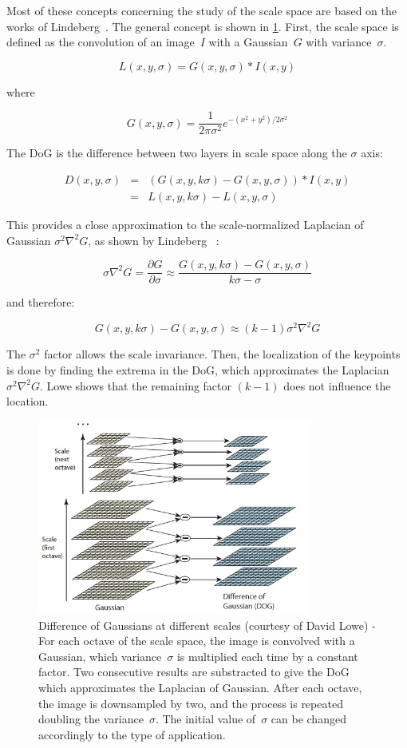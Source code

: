 Most of these concepts concerning the study of the scale space are based on the works of Lindeberg~\cite{Lindeberg_1994}. The general concept is shown in \ref{fig:sift_dog}. First, the scale space is defined as the convolution of an image~$I$ with a Gaussian~$G$ with variance~$\sigma$.

\[ L(x,y,\sigma) = G(x,y,\sigma) * I(x,y) \]

where

\[ G(x,y,\sigma) = \frac{1}{2\pi\sigma^2}e^{-{(x^2+y^2)/2\sigma^2}} \]


The \gls{DoG} is the difference between two layers in scale space along the $\sigma$ axis:

\[
\begin{array}{rcl}
D(x,y,\sigma) & = & (G(x,y, k\sigma) - G(x,y,\sigma)) * I(x,y) \\
 & = & L(x,y,k\sigma) - L(x,y,\sigma)
\end{array}
\] 

This provides a close approximation to the scale-normalized Laplacian of Gaussian $\sigma^2\nabla^2G$, as shown by Lindeberg ~\cite{Lindeberg_1994}:

\[ \sigma\nabla^2G = \frac{\partial G}{\partial \sigma} \approx \frac{G(x,y,k\sigma)-G(x,y,\sigma)}{k\sigma - \sigma} \]

and therefore:

\[ G(x,y,k\sigma) - G(x,y,\sigma) \approx (k-1)\sigma^2\nabla^2G \]

The $\sigma^2$ factor allows the scale invariance. Then, the localization of the keypoints is done by finding the extrema in the \gls{DoG}, which approximates the Laplacian~$\sigma^2\nabla^2G$. Lowe shows that the remaining factor $(k-1)$ does not influence the location. 

\begin{figure}[h]
\centering
\includegraphics[width=0.8\textwidth]{figures/sift_dog}
\caption{Difference of Gaussians at different scales (courtesy of David Lowe) - For each octave of the scale space, the image is convolved with a Gaussian, which variance~$\sigma$ is multiplied each time by a constant factor. Two consecutive results are substracted to give the DoG which approximates the Laplacian of Gaussian. After each octave, the image is downsampled by two, and the process is repeated doubling the variance~$\sigma$. The initial value of~$\sigma$ can be changed accordingly to the type of application. }
\label{fig:sift_dog}
\end{figure}

